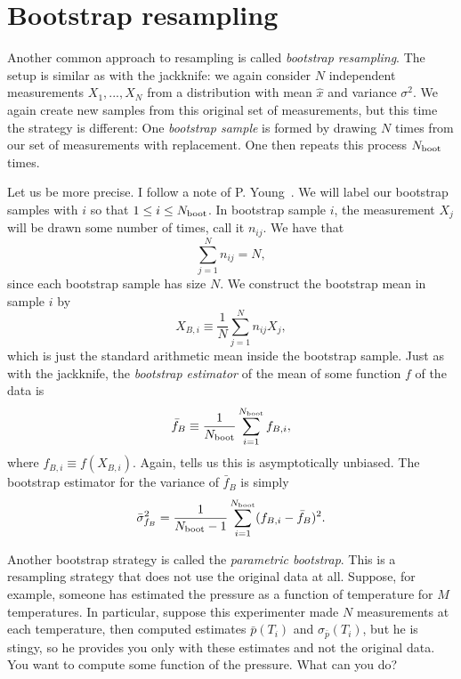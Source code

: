 \section{Bootstrap resampling}

Another common approach to resampling is called {\it bootstrap resampling}.
The setup is similar as with the jackknife: we again consider
$N$ independent measurements $X_1,...,X_N$ from a distribution with mean
$\hat{x}$ and variance $\sigma^2$. We again create new samples from
this original set of measurements, but this time the strategy is different:
One {\it bootstrap sample} is formed by drawing $N$ times from our set
of measurements with replacement. One then repeats this process
$N_{\text{boot}}$ times.

Let us be more precise. I follow a note of P. Young~\cite{youngBootstrap}.
We will label our bootstrap samples with $i$ so that
$1\leq i\leq N_{\text{boot}}$. In bootstrap sample $i$, the measurement
$X_j$ will be drawn some number of times, call it $n_{ij}$.
We have that
\begin{equation}
\sum_{j=1}^Nn_{ij}=N,
\end{equation}
since each bootstrap sample has size $N$. We construct the bootstrap mean in
sample $i$ by
\begin{equation}
X_{B,i}\equiv\frac{1}{N}\sum_{j=1}^Nn_{ij}X_j,
\end{equation}
which is just the standard arithmetic mean inside the bootstrap sample.
Just as with the jackknife, the {\it bootstrap estimator} of the mean
of some function $f$ of the data is
\begin{equation}\label{eq:bootstrap}
  \bar{f}_B\equiv\frac{1}{N_{\text{boot}}}\sum_{i=1}^{N_{\text{boot}}} f_{B,i},
\end{equation}
where $f_{B,i}\equiv f(X_{B,i})$. 
Again,  tells us this is asymptotically unbiased.
The bootstrap estimator for the variance of $\bar{f}_B$ is simply
\begin{equation}\label{eq:bootvar}
  \bar\sigma^2_{f_B}=\frac{1}{N_{\text{boot}}-1}\sum_{i=1}^{N_{\text{boot}}}(f_{B,i}-\bar{f}_B)^2.
\end{equation}

Another bootstrap strategy is called the {\it parametric
bootstrap}. This is a resampling strategy that does
not use the original data at all. Suppose, for example, someone has estimated 
the pressure as a function of temperature for $M$ temperatures. In particular,
suppose this experimenter made $N$ measurements at each temperature, then
computed estimates $\bar p(T_i)$ and $\sigma_{\bar p}(T_i)$, but he is stingy,
so he provides you only with these estimates and not the original data.
You want to compute some function of the pressure. What can you do?

